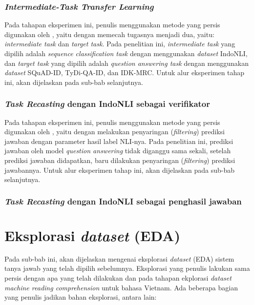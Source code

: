 \subsubsection{\emph{Intermediate-Task Transfer Learning}}
Pada tahapan eksperimen ini, penulis menggunakan metode yang persis digunakan oleh \citep{pruksachatkun-etal-2020-intermediate}, yaitu dengan memecah tugasnya menjadi dua, yaitu: \emph{intermediate task} dan \emph{target task}. Pada penelitian ini, \emph{intermediate task} yang dipilih adalah \emph{sequence classification task} dengan menggunakan \emph{dataset} IndoNLI, dan \emph{target task} yang dipilih adalah \emph{question answering task} dengan menggunakan \emph{dataset} SQuAD-ID, TyDi-QA-ID, dan IDK-MRC. Untuk alur eksperimen tahap ini, akan dijelaskan pada sub-bab selanjutnya.

\subsubsection{\emph{Task Recasting} dengan IndoNLI sebagai verifikator}
Pada tahapan eksperimen ini, penulis menggunakan metode yang persis digunakan oleh \citep{chen-etal-2021-nli-models}, yaitu dengan melakukan penyaringan (\emph{filtering}) prediksi jawaban dengan parameter hasil label NLI-nya. Pada penelitian ini, prediksi jawaban oleh model \emph{question answering} tidak diganggu sama sekali, setelah prediksi jawaban didapatkan, baru dilakukan penyaringan (\emph{filtering}) prediksi jawabannya. Untuk alur eksperimen tahap ini, akan dijelaskan pada sub-bab selanjutnya. 

\subsubsection{\emph{Task Recasting} dengan IndoNLI sebagai penghasil jawaban}
\todo

\section{Eksplorasi \emph{dataset} (EDA)}
Pada sub-bab ini, akan dijelaskan mengenai eksplorasi \emph{dataset} (EDA) sistem tanya jawab yang telah dipilih sebelumnya. Eksplorasi yang penulis lakukan sama persis dengan apa yang telah dilakukan \citet{nguyen-etal-2020-vietnamese} dan \citet{rajpurkar-etal-2016-squad} pada tahapan ekplorasi \emph{dataset machine reading comprehension} untuk bahasa Vietnam. Ada beberapa bagian yang penulis jadikan bahan eksplorasi, antara lain:


